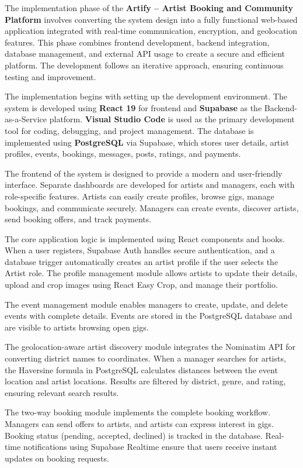 \documentclass[12pt,a4paper]{report}
\begin{document}
The implementation phase of the \textbf{Artify -- Artist Booking and Community Platform} involves converting the system design into a fully functional web-based application integrated with real-time communication, encryption, and geolocation features. This phase combines frontend development, backend integration, database management, and external API usage to create a secure and efficient platform. The development follows an iterative approach, ensuring continuous testing and improvement.

The implementation begins with setting up the development environment. The system is developed using \textbf{React 19} for frontend and \textbf{Supabase} as the Backend-as-a-Service platform. \textbf{Visual Studio Code} is used as the primary development tool for coding, debugging, and project management. The database is implemented using \textbf{PostgreSQL} via Supabase, which stores user details, artist profiles, events, bookings, messages, posts, ratings, and payments.

The frontend of the system is designed to provide a modern and user-friendly interface. Separate dashboards are developed for artists and managers, each with role-specific features. Artists can easily create profiles, browse gigs, manage bookings, and communicate securely. Managers can create events, discover artists, send booking offers, and track payments.

The core application logic is implemented using React components and hooks. When a user registers, Supabase Auth handles secure authentication, and a database trigger automatically creates an artist profile if the user selects the Artist role. The profile management module allows artists to update their details, upload and crop images using React Easy Crop, and manage their portfolio.

The event management module enables managers to create, update, and delete events with complete details. Events are stored in the PostgreSQL database and are visible to artists browsing open gigs.

The geolocation-aware artist discovery module integrates the Nominatim API for converting district names to coordinates. When a manager searches for artists, the Haversine formula in PostgreSQL calculates distances between the event location and artist locations. Results are filtered by district, genre, and rating, ensuring relevant search results.

The two-way booking module implements the complete booking workflow. Managers can send offers to artists, and artists can express interest in gigs. Booking status (pending, accepted, declined) is tracked in the database. Real-time notifications using Supabase Realtime ensure that users receive instant updates on booking requests.
\end{document}
